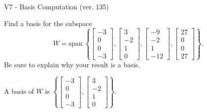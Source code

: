 \begin{exercise}
  \begin{exerciseTitle}V7 - Basis Computation (ver. 135)\end{exerciseTitle}
  \begin{exerciseStatement}
    Find a basis for the subspace 
\[W=\mathrm{span}\ \left\{\left[\begin{array}{r}
-3 \\
0 \\
0 \\
-3
\end{array}\right] , \left[\begin{array}{r}
3 \\
-2 \\
1 \\
0
\end{array}\right] , \left[\begin{array}{r}
-9 \\
-2 \\
1 \\
-12
\end{array}\right] , \left[\begin{array}{r}
27 \\
0 \\
0 \\
27
\end{array}\right]\right\}.\]
 Be sure to explain why your result is a basis.


  \end{exerciseStatement}
  \begin{exerciseAnswer}
   A basis of \(W\) is  \(\left\{\left[\begin{array}{r}
-3 \\
0 \\
0 \\
-3
\end{array}\right] , \left[\begin{array}{r}
3 \\
-2 \\
1 \\
0
\end{array}\right]\right\}\).
  


  \end{exerciseAnswer}
\end{exercise}